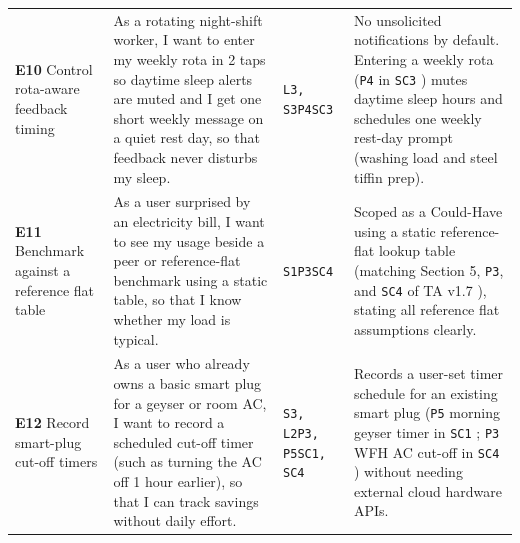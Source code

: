\documentclass[12pt, a4paper]{article}
\begin{document}
{\begin{longtable}{|>{\raggedright\arraybackslash}p{2.7cm}|>{\raggedright\arraybackslash}p{5.2cm}|>{\raggedright\arraybackslash}p{2.9cm}|>{\raggedright\arraybackslash}p{5.2cm}|}
\rowcolor{bgSand}\multicolumn{4}{|l|}{\textbf{\textcolor{cTerracotta}{COULD HAVE: Rota Timing, Static Reference-Flat Benchmarks, and Timer Helpers}}} \\
\hline
\textbf{E10} Control rota-aware feedback timing & As a rotating night-shift worker, I want to enter my weekly rota in 2 taps so daytime sleep alerts are muted and I get one short weekly message on a quiet rest day, so that feedback never disturbs my sleep. & \texttt{L3, S3}\newline \texttt{P4}\newline \texttt{SC3} & No unsolicited notifications by default. Entering a weekly rota (\texttt{P4} in \texttt{SC3} \cite{cf9}) mutes daytime sleep hours and schedules one weekly rest-day prompt (washing load and steel tiffin prep). \\
\hline
\textbf{E11} Benchmark against a reference flat table & As a user surprised by an electricity bill, I want to see my usage beside a peer or reference-flat benchmark using a static table, so that I know whether my load is typical. & \texttt{S1}\newline \texttt{P3}\newline \texttt{SC4} & Scoped as a Could-Have using a static reference-flat lookup table (matching Section 5, \texttt{P3}, and \texttt{SC4} of TA v1.7 \cite{lee2021,cf2}), stating all reference flat assumptions clearly. \\
\hline
\textbf{E12} Record smart-plug cut-off timers & As a user who already owns a basic smart plug for a geyser or room AC, I want to record a scheduled cut-off timer (such as turning the AC off 1 hour earlier), so that I can track savings without daily effort. & \texttt{S3, L2}\newline \texttt{P3, P5}\newline \texttt{SC1, SC4} & Records a user-set timer schedule for an existing smart plug (\texttt{P5} morning geyser timer in \texttt{SC1} \cite{cf3}; \texttt{P3} WFH AC cut-off in \texttt{SC4} \cite{cf2}) without needing external cloud hardware APIs. \\
\hline


\end{longtable}}
\end{document}
